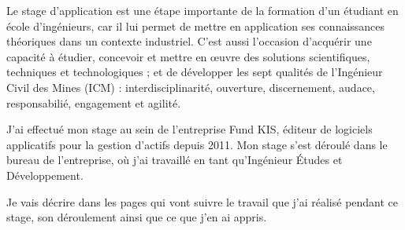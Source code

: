 Le stage d'application est une étape importante de la formation d'un étudiant en école d'ingénieurs, car il lui permet de mettre en application ses connaissances théoriques dans un contexte industriel. C'est aussi l'occasion d'acquérir une capacité à étudier, concevoir et mettre en \oe uvre des solutions scientifiques, techniques et technologiques ; et de développer les sept qualités de l'Ingénieur Civil des Mines (ICM) : interdisciplinarité, ouverture, discernement, audace, responsabilié, engagement et agilité.

\vspace{3mm}

J'ai effectué mon stage au sein de l'entreprise Fund KIS, éditeur de logiciels applicatifs pour la gestion d'actifs depuis 2011. Mon stage s'est déroulé dans le bureau de l'entreprise, où j'ai travaillé en tant qu'Ingénieur \'Etudes et Développement.

\vspace{3mm}

Je vais décrire dans les pages qui vont suivre le travail que j'ai réalisé pendant ce stage, son déroulement ainsi que ce que j'en ai appris.
